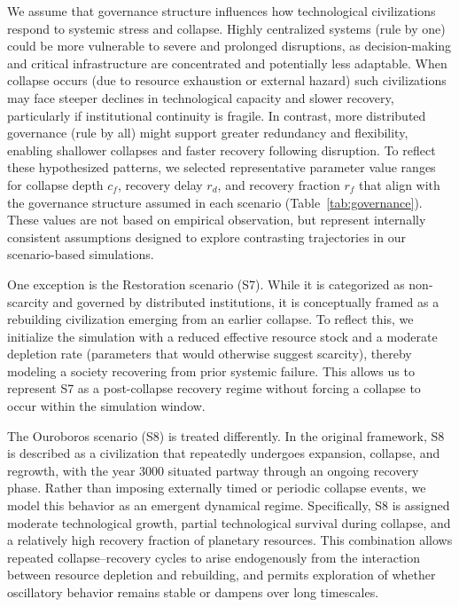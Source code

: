 We assume that governance structure influences how technological civilizations respond to systemic stress and collapse. Highly centralized systems (rule by one) could be more vulnerable to severe and prolonged disruptions, as decision-making and critical infrastructure are concentrated and potentially less adaptable. When collapse occurs (due to resource exhaustion or external hazard) such civilizations may face steeper declines in technological capacity and slower recovery, particularly if institutional continuity is fragile. In contrast, more distributed governance (rule by all) might support greater redundancy and flexibility, enabling shallower collapses and faster recovery following disruption. To reflect these hypothesized patterns, we selected representative parameter value ranges for collapse depth \(c_{f}\), recovery delay \(r_{d}\), and recovery fraction \(r_{f}\) that align with the governance structure assumed in each scenario (Table~\ref{tab:governance}). These values are not based on empirical observation, but represent internally consistent assumptions designed to explore contrasting trajectories in our scenario-based simulations. 

One exception is the Restoration scenario (S7). While it is categorized as non-scarcity and governed by distributed institutions, it is conceptually framed as a rebuilding civilization emerging from an earlier collapse. To reflect this, we initialize the simulation with a reduced effective resource stock and a moderate depletion rate (parameters that would otherwise suggest scarcity), thereby modeling a society recovering from prior systemic failure. This allows us to represent S7 as a post-collapse recovery regime without forcing a collapse to occur within the simulation window.

The Ouroboros scenario (S8) is treated differently. In the original framework, S8 is described as a civilization that repeatedly undergoes expansion, collapse, and regrowth, with the year 3000 situated partway through an ongoing recovery phase. Rather than imposing externally timed or periodic collapse events, we model this behavior as an emergent dynamical regime. Specifically, S8 is assigned moderate technological growth, partial technological survival during collapse, and a relatively high recovery fraction of planetary resources. This combination allows repeated collapse--recovery cycles to arise endogenously from the interaction between resource depletion and rebuilding, and permits exploration of whether oscillatory behavior remains stable or dampens over long timescales.

